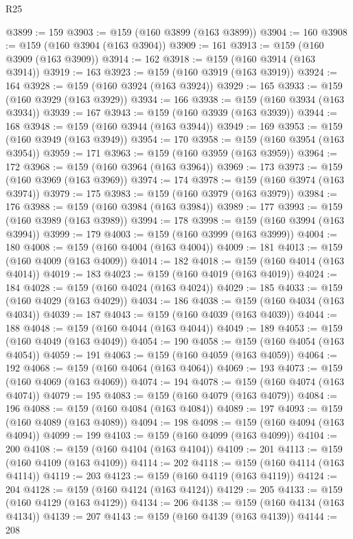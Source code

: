 \begin{lexlean}{R25}
\begin{coremodule}
@3899 := 159
@3903 := @159 (@160 @3899 (@163 @3899))
@3904 := 160
@3908 := @159 (@160 @3904 (@163 @3904))
@3909 := 161
@3913 := @159 (@160 @3909 (@163 @3909))
@3914 := 162
@3918 := @159 (@160 @3914 (@163 @3914))
@3919 := 163
@3923 := @159 (@160 @3919 (@163 @3919))
@3924 := 164
@3928 := @159 (@160 @3924 (@163 @3924))
@3929 := 165
@3933 := @159 (@160 @3929 (@163 @3929))
@3934 := 166
@3938 := @159 (@160 @3934 (@163 @3934))
@3939 := 167
@3943 := @159 (@160 @3939 (@163 @3939))
@3944 := 168
@3948 := @159 (@160 @3944 (@163 @3944))
@3949 := 169
@3953 := @159 (@160 @3949 (@163 @3949))
@3954 := 170
@3958 := @159 (@160 @3954 (@163 @3954))
@3959 := 171
@3963 := @159 (@160 @3959 (@163 @3959))
@3964 := 172
@3968 := @159 (@160 @3964 (@163 @3964))
@3969 := 173
@3973 := @159 (@160 @3969 (@163 @3969))
@3974 := 174
@3978 := @159 (@160 @3974 (@163 @3974))
@3979 := 175
@3983 := @159 (@160 @3979 (@163 @3979))
@3984 := 176
@3988 := @159 (@160 @3984 (@163 @3984))
@3989 := 177
@3993 := @159 (@160 @3989 (@163 @3989))
@3994 := 178
@3998 := @159 (@160 @3994 (@163 @3994))
@3999 := 179
@4003 := @159 (@160 @3999 (@163 @3999))
@4004 := 180
@4008 := @159 (@160 @4004 (@163 @4004))
@4009 := 181
@4013 := @159 (@160 @4009 (@163 @4009))
@4014 := 182
@4018 := @159 (@160 @4014 (@163 @4014))
@4019 := 183
@4023 := @159 (@160 @4019 (@163 @4019))
@4024 := 184
@4028 := @159 (@160 @4024 (@163 @4024))
@4029 := 185
@4033 := @159 (@160 @4029 (@163 @4029))
@4034 := 186
@4038 := @159 (@160 @4034 (@163 @4034))
@4039 := 187
@4043 := @159 (@160 @4039 (@163 @4039))
@4044 := 188
@4048 := @159 (@160 @4044 (@163 @4044))
@4049 := 189
@4053 := @159 (@160 @4049 (@163 @4049))
@4054 := 190
@4058 := @159 (@160 @4054 (@163 @4054))
@4059 := 191
@4063 := @159 (@160 @4059 (@163 @4059))
@4064 := 192
@4068 := @159 (@160 @4064 (@163 @4064))
@4069 := 193
@4073 := @159 (@160 @4069 (@163 @4069))
@4074 := 194
@4078 := @159 (@160 @4074 (@163 @4074))
@4079 := 195
@4083 := @159 (@160 @4079 (@163 @4079))
@4084 := 196
@4088 := @159 (@160 @4084 (@163 @4084))
@4089 := 197
@4093 := @159 (@160 @4089 (@163 @4089))
@4094 := 198
@4098 := @159 (@160 @4094 (@163 @4094))
@4099 := 199
@4103 := @159 (@160 @4099 (@163 @4099))
@4104 := 200
@4108 := @159 (@160 @4104 (@163 @4104))
@4109 := 201
@4113 := @159 (@160 @4109 (@163 @4109))
@4114 := 202
@4118 := @159 (@160 @4114 (@163 @4114))
@4119 := 203
@4123 := @159 (@160 @4119 (@163 @4119))
@4124 := 204
@4128 := @159 (@160 @4124 (@163 @4124))
@4129 := 205
@4133 := @159 (@160 @4129 (@163 @4129))
@4134 := 206
@4138 := @159 (@160 @4134 (@163 @4134))
@4139 := 207
@4143 := @159 (@160 @4139 (@163 @4139))
@4144 := 208

\end{coremodule}
\end{lexlean}
